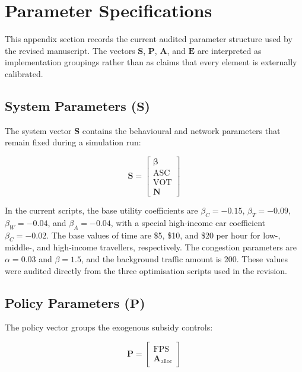 \section{Parameter Specifications}
\label{app:param_specs}

This appendix section records the current audited parameter structure used by the revised manuscript. The vectors $\mathbf{S}$, $\mathbf{P}$, $\mathbf{A}$, and $\mathbf{E}$ are interpreted as implementation groupings rather than as claims that every element is externally calibrated.

\subsection{System Parameters \texorpdfstring{($\mathbf{S}$)}{(S)}}
The system vector $\mathbf{S}$ contains the behavioural and network parameters that remain fixed during a simulation run:

\begin{equation}
\mathbf{S} = \begin{bmatrix} \boldsymbol{\beta} \\ \text{ASC} \\ \text{VOT} \\ \mathbf{N} \end{bmatrix}
\end{equation}

In the current scripts, the base utility coefficients are $\beta_C=-0.15$, $\beta_T=-0.09$, $\beta_W=-0.04$, and $\beta_A=-0.04$, with a special high-income car coefficient $\beta_C=-0.02$. The base values of time are \$5, \$10, and \$20 per hour for low-, middle-, and high-income travellers, respectively. The congestion parameters are $\alpha=0.03$ and $\beta=1.5$, and the background traffic amount is 200. These values were audited directly from the three optimisation scripts used in the revision.

\subsection{Policy Parameters \texorpdfstring{($\mathbf{P}$)}{(P)}}
The policy vector groups the exogenous subsidy controls:

\begin{equation}
\mathbf{P} = \begin{bmatrix} \text{FPS} \\ \mathbf{A}_{\text{alloc}} \end{bmatrix}
\end{equation}

